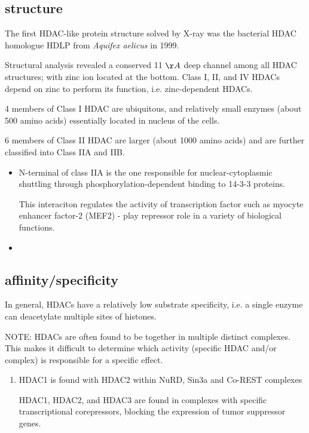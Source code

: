\subsection{structure}
\label{sec:HDAC-structure}

The first HDAC-like protein structure solved by X-ray was the bacterial HDAC
homologue HDLP from {\it Aquifex aelicus} in 1999.

Structural analysis revealed a conserved 11 $\AA$ deep channel among all HDAC
structures; with zinc ion located at the bottom. Class I, II, and IV HDACs
depend on zinc to perform its function,  i.e. zinc-dependent HDACs.

4 members of Class I HDAC are ubiquitous, and relatively small enzymes (about
500 amino acids) essentially located in nucleus of the cells.

6 members of Class II HDAC are larger (about 1000 amino acids) and are further
classified into Class IIA and IIB. 
\begin{itemize}
  \item N-terminal of class IIA is the one responsible for nuclear-cytoplasmic
  shuttling through phosphorylation-dependent binding to 14-3-3 proteins.
  
  This interaciton regulates the activity of transcription factor such as 
  myocyte enhancer factor-2 (MEF2) - play repressor role in a variety of
  biological functions.
  
  \item 
\end{itemize}



\subsection{affinity/specificity}
\label{sec:HDAC-affinity}

In general, HDACs have a relatively low substrate specificity, i.e. a single
enzyme can deacetylate multiple sites of histones.

NOTE: HDACs are often found to be together in multiple distinct complexes.
This makes it difficult to determine which activity (specific HDAC and/or
complex) is responsible for a specific effect.
\begin{enumerate}
  \item HDAC1 is found with HDAC2 within NuRD, Sin3a and Co-REST complexes
  
  HDAC1, HDAC2, and HDAC3 are found in complexes with specific transcriptional
  corepressors, blocking the expression of tumor suppressor genes.
  
\end{enumerate}



